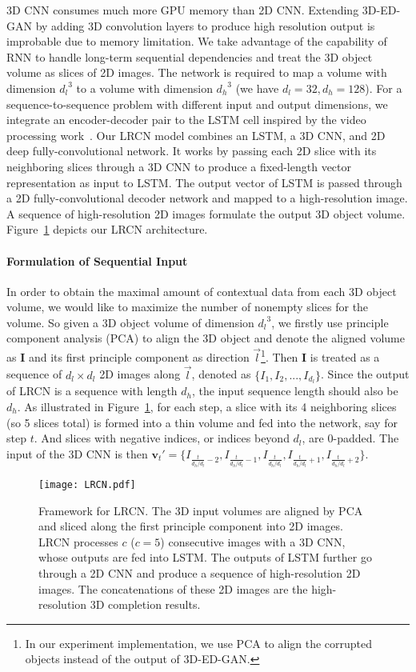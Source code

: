 \documentclass[10pt,twocolumn,letterpaper]{article}
\begin{document}
3D CNN consumes much more GPU memory than 2D CNN. Extending 3D-ED-GAN by adding 3D convolution layers to produce high resolution output is improbable due to memory limitation. We take advantage of the capability of RNN to handle long-term sequential dependencies and treat the 3D object volume as slices of 2D images. The network is required to map a volume with dimension ${d_l}^3$ to a volume with dimension ${d_h}^3$ (we have $d_l=32, d_h=128$). For a sequence-to-sequence problem with different input and output dimensions, we integrate an encoder-decoder pair to the LSTM cell inspired by the video processing work~\cite{LRCNvideo}. Our LRCN model combines an LSTM, a 3D CNN, and 2D deep fully-convolutional network. It works by passing each 2D slice with its neighboring slices through a 3D CNN to produce a fixed-length vector representation as input to LSTM. The output vector of LSTM is passed through a 2D fully-convolutional decoder network and mapped to a high-resolution image. A sequence of high-resolution 2D images formulate the output 3D object volume. Figure~\ref{fig:LRCN} depicts our LRCN architecture.%

\paragraph*{Formulation of Sequential Input} In order to obtain the maximal amount of contextual data from each 3D object volume, we would like to maximize the number of nonempty slices for the volume. So given a 3D object volume of dimension ${d_l}^3$, we firstly use principle component analysis (PCA) to align the 3D object and denote the aligned volume as $\mathbf{I}$ and its first principle component as direction $\overrightarrow{l}$\footnote{In our experiment implementation, we use PCA to align the corrupted objects instead of the output of 3D-ED-GAN.}. Then $\mathbf{I}$ is treated as a sequence of $d_l\times d_l$ 2D images along $\overrightarrow{l}$, denoted as $\{I_1, I_2,..., I_{d_l}\}$. Since the output of LRCN is a sequence with length $d_h$, the input sequence length should also be $d_h$. As illustrated in Figure~\ref{fig:LRCN}, for each step, a slice with its 4 neighboring slices (so 5 slices total) is formed into a thin volume and fed into the network, say for step $t$. And slices with negative indices, or indices beyond $d_l$, are 0-padded. The input of the 3D CNN is then $\mathbf{v}_t' = \{ I_{{\frac{t}{d_h/d_l} }- 2},I_{{\frac{t}{d_h/d_l} }-1},I_{\frac{t}{d_h/d_l} },I_{{\frac{t}{d_h/d_l} }+1},I_{{\frac{t}{d_h/d_l} }+2} \}$.
\begin{figure}[t]
    \texttt{[image: LRCN.pdf]}
    \caption{Framework for LRCN. The 3D input volumes are aligned by PCA and sliced along the first principle component into 2D images. LRCN processes $c$ ($c=5$) consecutive images with a 3D CNN, whose outputs are fed into LSTM. The outputs of LSTM further go through a 2D CNN and produce a sequence of high-resolution 2D images. The concatenations of these 2D images are the high-resolution 3D completion results.}
    \label{fig:LRCN}
\end{figure}
\end{document}
